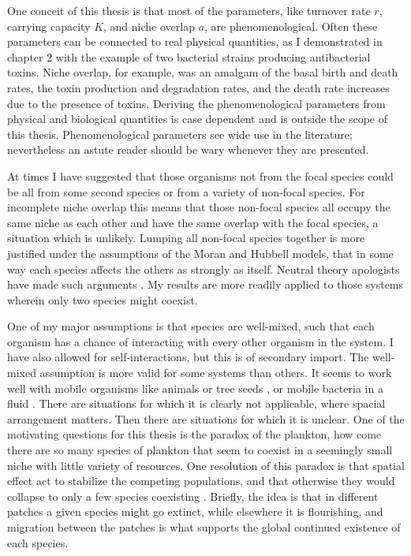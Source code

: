 One conceit of this thesis is that most of the parameters, like turnover rate $r$, carrying capacity $K$, and niche overlap $a$, are phenomenological. 
Often these parameters can be connected to real physical quantities, as I demonstrated in chapter 2 with the example of two bacterial strains producing antibacterial toxins. 
Niche overlap, for example, was an amalgam of the basal birth and death rates, the toxin production and degradation rates, and the death rate increases due to the presence of toxins. %
Deriving the phenomenological parameters from physical and biological quantities is case dependent and is outside the scope of this thesis. 
Phenomenological parameters see wide use in the literature; nevertheless an astute reader should be wary whenever they are presented. 

At times I have suggested that those organisms not from the focal species could be all from some second species or from a variety of non-focal species. 
For incomplete niche overlap this means that those non-focal species all occupy the same niche as each other and have the same overlap with the focal species, a situation which is unlikely. 
Lumping all non-focal species together is more justified under the assumptions of the Moran and Hubbell models, that in some way each species affects the others as strongly as itself. 
Neutral theory apologists have made such arguments \cite{Hubbell2006,Rosindell2011}. %
My results are more readily applied to those systems wherein only two species might coexist. 

One of my major assumptions is that species are well-mixed, such that each organism has a chance of interacting with every other organism in the system. 
I have also allowed for self-interactions, but this is of secondary import. 
The well-mixed assumption is more valid for some systems than others. 
It seems to work well with mobile organisms like animals or tree seeds \cite{Hubbell2001}, or mobile bacteria in a fluid \cite{???}. %
There are situations for which it is clearly not applicable, where spacial arrangement matters. 
Then there are situations for which it is unclear. 
One of the motivating questions for this thesis is the paradox of the plankton, how come there are so many species of plankton that seem to coexist in a seemingly small niche with little variety of resources. 
One resolution of this paradox is that spatial effect act to stabilize the competing populations, and that otherwise they would collapse to only a few species coexisting \cite{Roy2007}. 
Briefly, the idea is that in different patches a given species might go extinct, while elsewhere it is flourishing, and migration between the patches is what supports the global continued existence of each species. 

